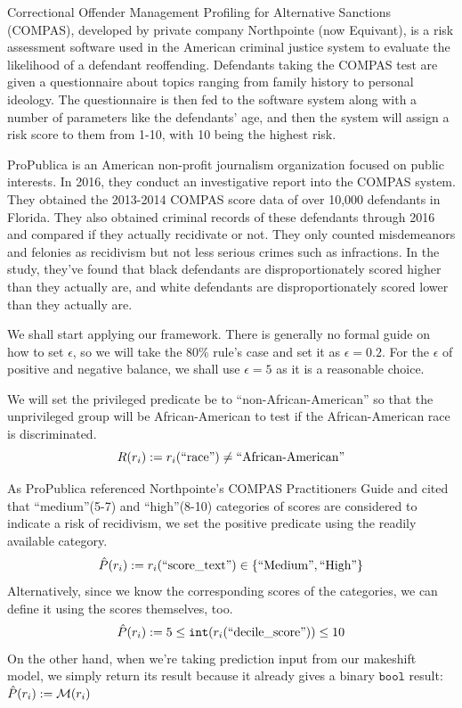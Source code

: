\documentclass[conference]{IEEEtran}
\begin{document}
Correctional Offender Management Profiling for Alternative Sanctions (COMPAS), developed by private company Northpointe (now Equivant), is a risk assessment software used in the American criminal justice system to evaluate the likelihood of a defendant reoffending. Defendants taking the COMPAS test are given a questionnaire about topics ranging from family history to personal ideology. The questionnaire is then fed to the software system along with a number of parameters like the defendants' age, and then the system will assign a risk score to them from 1-10, with 10 being the highest risk.

ProPublica is an American non-profit journalism organization focused on public interests. In 2016, they conduct an investigative report into the COMPAS system. They obtained the 2013-2014 COMPAS score data of over 10,000 defendants in Florida. They also obtained criminal records of these defendants through 2016 and compared if they actually recidivate or not. They only counted misdemeanors and felonies as recidivism but not less serious crimes such as infractions. In the study, they've found that black defendants are disproportionately scored higher than they actually are, and white defendants are disproportionately scored lower than they actually are.

We shall start applying our framework. There is generally no formal guide on how to set $\epsilon$, so we will take the 80\% rule's case and set it as $\epsilon = 0.2$. For the $\epsilon$ of positive and negative balance, we shall use $\epsilon = 5$ as it is a reasonable choice.

We will set the privileged predicate be to ``non-African-American'' so that the unprivileged group will be African-American to test if the African-American race is discriminated.
\[
    R(r_i) := r_i(\text{``race''}) \neq \text{``African-American''}
\]

As ProPublica referenced Northpointe's COMPAS Practitioners Guide and cited that ``medium''(5-7) and ``high''(8-10) categories of scores are considered to indicate a risk of recidivism, we set the positive predicate using the readily available category.
\[
    \hat{P}(r_i) := r_i(\text{``score\_text''}) \in \{\text{``Medium''},\text{``High''}\}
\]
Alternatively, since we know the corresponding scores of the categories, we can define it using the scores themselves, too.
\[
    \hat{P}(r_i) := 5 \leq \mathtt{int}(r_i(\text{``decile\_score''})) \leq 10
\]
On the other hand, when we're taking prediction input from our makeshift model, we simply return its result because it already gives a binary $\mathtt{bool}$ result: $\hat{P}(r_i) := \mathcal{M}(r_i)$
\end{document}
